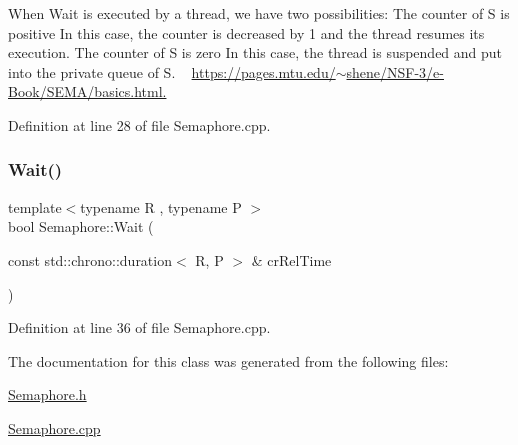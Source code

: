 When Wait is executed by a thread, we have two possibilities\+: The counter of S is positive In this case, the counter is decreased by 1 and the thread resumes its execution. The counter of S is zero In this case, the thread is suspended and put into the private queue of S. ~\newline
\hyperlink{}{https\+://pages.\+mtu.\+edu/$\sim$shene/\+N\+S\+F-\/3/e-\/\+Book/\+S\+E\+M\+A/basics.\+html.}



Definition at line 28 of file Semaphore.\+cpp.

\mbox{\label{class_semaphore_a7f700173ae86ae623684109066e07656}} 
\subsubsection{\texorpdfstring{Wait()}{Wait()}\hspace{0.1cm}{\footnotesize\ttfamily [2/2]}}
{\footnotesize\ttfamily template$<$typename R , typename P $>$ \\
bool Semaphore\+::\+Wait (\begin{DoxyParamCaption}\item[{const std\+::chrono\+::duration$<$ R, P $>$ \&}]{cr\+Rel\+Time }\end{DoxyParamCaption})}



Definition at line 36 of file Semaphore.\+cpp.



The documentation for this class was generated from the following files\+:\begin{DoxyCompactItemize}
\item 
\hyperlink{_semaphore_8h}{Semaphore.\+h}\item 
\hyperlink{_semaphore_8cpp}{Semaphore.\+cpp}\end{DoxyCompactItemize}
